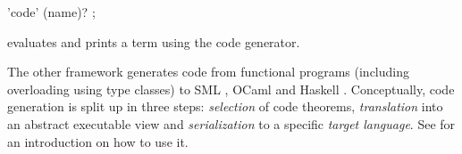 \begin{isabellebody}
\begin{isamarkuptext}
\begin{rail}
  'code' (name)?
  ;
  \end{rail}

  \begin{descr}

  \item [\hyperlink{command.HOL.value}{\mbox{\isa{\isacommand{value}}}}~\isa{t}] evaluates and prints a
  term using the code generator.

  \end{descr}

  \medskip The other framework generates code from functional programs
  (including overloading using type classes) to SML \cite{SML}, OCaml
  \cite{OCaml} and Haskell \cite{haskell-revised-report}.
  Conceptually, code generation is split up in three steps:
  \emph{selection} of code theorems, \emph{translation} into an
  abstract executable view and \emph{serialization} to a specific
  \emph{target language}.  See \cite{isabelle-codegen} for an
  introduction on how to use it.


\end{isamarkuptext}
\end{isabellebody}
